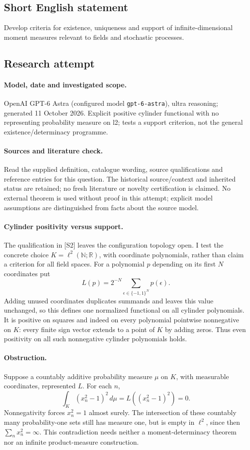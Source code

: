 \documentclass[11pt]{article}
\begin{document}
\subsection{Short English statement}
Develop criteria for existence, uniqueness and support of infinite-dimensional moment measures relevant to fields and stochastic processes.
\subsection{Research attempt}
\paragraph{Model, date and investigated scope.}
OpenAI GPT-6 Astra (configured model \texttt{gpt-6-astra}), ultra reasoning; generated 11 October 2026. Explicit positive cylinder functional with no representing probability measure on l2; tests a support criterion, not the general existence/determinacy programme.

\paragraph{Sources and literature check.}
Read the supplied definition, catalogue wording, source qualifications and reference entries for this question. The historical source/context and inherited status are retained; no fresh literature or novelty certification is claimed. No external theorem is used without proof in this attempt; explicit model assumptions are distinguished from facts about the source model.

\paragraph{Cylinder positivity versus support.} The qualification in [S2] leaves the configuration topology open. I test the concrete choice \(K=\ell^2(\mathbb N;\mathbb R)\), with coordinate polynomials, rather than claim a criterion for all field spaces. For a polynomial \(p\) depending on its first \(N\) coordinates put
\[
 L(p)=2^{-N}\sum_{\epsilon\in\{-1,1\}^N}p(\epsilon).
\]
Adding unused coordinates duplicates summands and leaves this value unchanged, so this defines one normalized functional on all cylinder polynomials. It is positive on squares and indeed on every polynomial pointwise nonnegative on \(K\): every finite sign vector extends to a point of \(K\) by adding zeros. Thus even positivity on all such nonnegative cylinder polynomials holds.
\paragraph{Obstruction.} Suppose a countably additive probability measure \(\mu\) on \(K\), with measurable coordinates, represented \(L\). For each \(n\),
\[
 \int_K(x_n^2-1)^2\,d\mu=L((x_n^2-1)^2)=0.
\]
Nonnegativity forces \(x_n^2=1\) almost surely. The intersection of these countably many probability-one sets still has measure one, but is empty in \(\ell^2\), since then \(\sum_nx_n^2=\infty\). This contradiction needs neither a moment-determinacy theorem nor an infinite product-measure construction.
\end{document}
